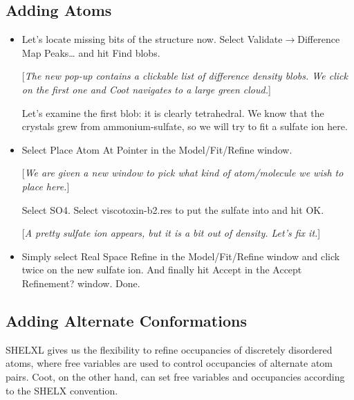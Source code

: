 \documentclass{article}
\begin{document}
\subsection{Adding Atoms}
\begin{itemize}

\item Let's locate missing bits of the structure now. Select
  \textsf{Validate$\to$Difference Map Peaks\ldots} and hit
  \textsf{Find blobs}.

  [\textsl{The new pop-up contains a clickable list of difference
    density blobs. We click on the first one and Coot navigates to a
    large green cloud.}]

  Let's examine the first blob: it is clearly tetrahedral. We know
  that the crystals grew from ammonium-sulfate, so we will try to fit
  a sulfate ion here.

\item Select \textsf{Place Atom At Pointer} in the \textsf{Model/Fit/Refine} window.

[\textsl{We are given a new window to pick what kind of atom/molecule we wish to place here.}]

Select \textsf{SO4}. Select viscotoxin-b2.res to put the sulfate into
and hit \textsf{OK}.

[\textsl{A pretty sulfate ion appears, but it is a bit out of density. Let's fix it.}]

\item Simply select \textsf{Real Space Refine} in the
  \textsf{Model/Fit/Refine} window and click twice on the new sulfate
  ion. And finally hit \textsf{Accept} in the \textsf{Accept
    Refinement?} window. Done.


\end{itemize}

\subsection{Adding Alternate Conformations}

SHELXL gives us the flexibility to refine occupancies of discretely
disordered atoms, where free variables are used to control occupancies
of alternate atom pairs. Coot, on the other hand, can set free
variables and occupancies according to the SHELX convention.
\end{document}
